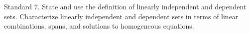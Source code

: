 Standard 7.	State and use the definition of linearly independent and dependent sets. Characterize linearly independent and dependent sets in terms of linear combinations, spans, and solutions to homogeneous equations.

\ifprintanswers
\else %
 \newpage
\fi

\begin{solution}
   
\end{solution}